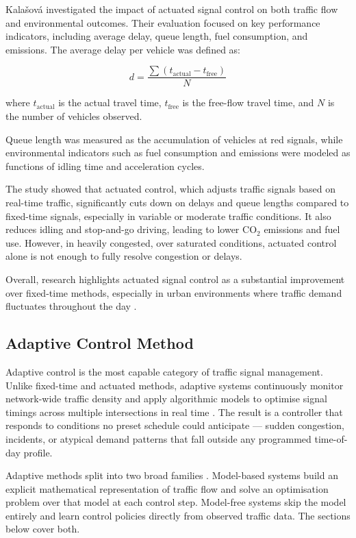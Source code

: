 \documentclass[11pt, a4paper]{report}
\begin{document}
Kalašová \cite{kalavsova2022impact} investigated the impact of actuated signal control on both traffic flow and environmental outcomes. Their evaluation focused on key performance indicators, including average delay, queue length, fuel consumption, and emissions. The average delay per vehicle was defined as:

\begin{equation}
d = \frac{\sum (t_{\text{actual}} - t_{\text{free}})}{N}
\label{eq:average-delay}
\end{equation}

where $t_{\text{actual}}$ is the actual travel time, $t_{\text{free}}$ is the free-flow travel time, and $N$ is the number of vehicles observed.

Queue length was measured as the accumulation of vehicles at red signals, while environmental indicators such as fuel consumption and emissions were modeled as functions of idling time and acceleration cycles.

The study showed that actuated control, which adjusts traffic signals based on real-time traffic, significantly cuts down on delays and queue lengths compared to fixed-time signals, especially in variable or moderate traffic conditions. It also reduces idling and stop-and-go driving, leading to lower CO$_2$ emissions and fuel use. However, in heavily congested, over saturated conditions, actuated control alone is not enough to fully resolve congestion or delays.

Overall, research highlights actuated signal control as a substantial improvement over fixed-time methods, especially in urban environments where traffic demand fluctuates throughout the day \cite{kalavsova2022impact}.

\subsection{Adaptive Control Method}

Adaptive control is the most capable category of traffic signal management. Unlike fixed-time and actuated methods, adaptive systems continuously monitor network-wide traffic density and apply algorithmic models to optimise signal timings across multiple intersections in real time \cite{mannion2016experimental}. The result is a controller that responds to conditions no preset schedule could anticipate --- sudden congestion, incidents, or atypical demand patterns that fall outside any programmed time-of-day profile.

Adaptive methods split into two broad families \cite{ye2019survey}. Model-based systems build an explicit mathematical representation of traffic flow and solve an optimisation problem over that model at each control step. Model-free systems skip the model entirely and learn control policies directly from observed traffic data. The sections below cover both.
\end{document}
